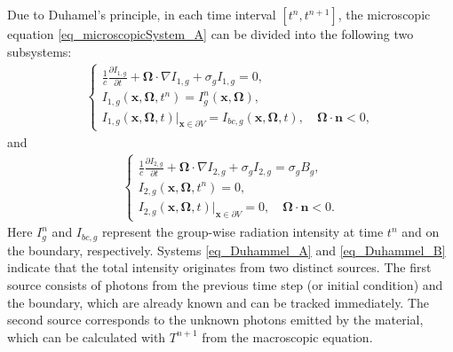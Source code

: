 \documentclass[preprint,12pt]{elsarticle}
\theoremstyle{definition}
\theoremstyle{plain}
\numberwithin{equation}{section}
\numberwithin{algorithm}{section}
\newcounter{eq_count}
\newcommand{\vOmega}{\mathbf{\Omega}}
\newcommand{\vx}{\mathbf{x}}
\newcommand{\dd}{{\text{d}}}
\begin{document}
    Due to Duhamel’s principle, in each time interval $[t^n,t^{n+1}]$, the microscopic equation \eqref{eq_microscopicSystem_A} can be divided into the following two subsystems:
\begin{equation} \label{eq_Duhammel_A}
\begin{aligned}
 \left\{
\begin{array}{l}
\frac{1}{c} \frac{\partial I_{1,g}}{\partial t} + \vOmega \cdot \nabla I_{1,g} + \sigma_g I_{1,g} = 0, \\[8pt]
I_{1,g}(\vx, \vOmega, t^n) = I_{g}^n(\vx, \vOmega), \\[8pt]
I_{1,g}(\vx, \vOmega, t)\big|_{\vx \in \partial V} = I_{bc,g}(\vx, \vOmega, t), \quad \vOmega \cdot \mathbf{n} < 0,
\end{array}
\right.
\end{aligned}
\end{equation}
and  
\begin{equation} \label{eq_Duhammel_B}
\begin{aligned}
\left\{
\begin{array}{l}
\frac{1}{c} \frac{\partial I_{2,g}}{\partial t} + \vOmega \cdot \nabla I_{2,g} + \sigma_g I_{2,g}= \sigma_g  B_g, \\[8pt]
I_{2,g}(\vx, \vOmega, t^n) = 0, \\[8pt]
I_{2,g}(\vx, \vOmega, t)\big|_{\vx \in \partial V} = 0, \quad \vOmega \cdot \mathbf{n} < 0.
\end{array}
\right.
\end{aligned}
\end{equation}
Here $I_{g}^n$ and $I_{bc,g}$ represent the group-wise radiation intensity 
at time $t^n$ and on the boundary, respectively. 
Systems \eqref{eq_Duhammel_A} and \eqref{eq_Duhammel_B} indicate that 
the total intensity originates from two distinct sources. 
The first source consists of photons from the previous time step 
(or initial condition) and the boundary, which are already known and can be tracked immediately. 
The second source corresponds to the unknown photons emitted by the material, 
which can be calculated with $T^{n+1}$ from  the macroscopic equation.
\end{document}
